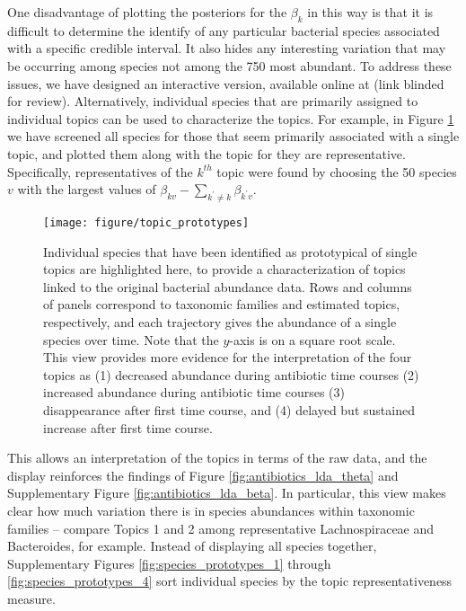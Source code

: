\documentclass[oupdraft]{bio}
\begin{document}
One disadvantage of plotting the posteriors for the $\beta_{k}$ in this way is
that it is difficult to determine the identify of any particular bacterial
species associated with a specific credible interval. It also hides any
interesting variation that may be occurring among species not among the 750 most
abundant. To address these issues, we have designed an interactive version,
available online at
(link blinded for review).
Alternatively,
individual species that are primarily assigned to individual topics can be used
to characterize the topics. For example, in Figure \ref{fig:topic_prototypes} we
have screened all species for those that seem primarily associated with a single
topic, and plotted them along with the topic for they are representative.
Specifically, representatives of the $k^{th}$ topic were found by choosing the
50 species $v$ with the largest values of $\beta_{kv} - \sum_{k^{\prime} \neq k}
\beta_{k^{\prime} v}$.

\begin{figure}
  \centering\texttt{[image: figure/topic\_prototypes]}
  \caption{Individual species that have been identified as prototypical of
    single topics are highlighted here, to provide a characterization of topics
    linked to the original bacterial abundance data. Rows and columns of panels
    correspond to taxonomic families and estimated topics,
    respectively, and each trajectory gives the abundance of a single species
    over time. Note that the $y$-axis is on a square root scale. This view
    provides more evidence for the interpretation of the four topics as (1)
    decreased abundance during antibiotic time courses (2) increased abundance during
    antibiotic time courses (3) disappearance after first time course, and (4)
    delayed but sustained increase after first time
    course. \label{fig:topic_prototypes}}
\end{figure}

This allows an interpretation of the topics in terms of the raw data, and the
display reinforces the findings of Figure \ref{fig:antibiotics_lda_theta} and
Supplementary Figure \ref{fig:antibiotics_lda_beta}. In particular, this view
makes clear how much variation there is in species abundances within taxonomic
families -- compare Topics 1 and 2 among representative Lachnospiraceae and
Bacteroides, for example. Instead of displaying all species together,
Supplementary Figures \ref{fig:species_prototypes_1} through
\ref{fig:species_prototypes_4} sort individual species by the topic
representativeness measure.
\end{document}
